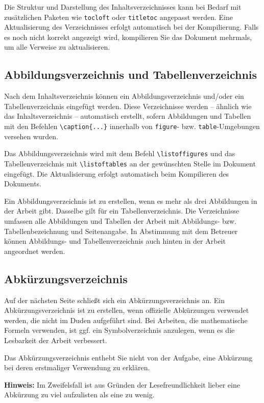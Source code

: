 Die Struktur und Darstellung des Inhaltsverzeichnisses kann bei Bedarf mit zusätzlichen Paketen wie \verb|tocloft| oder \verb|titletoc| angepasst werden. Eine Aktualisierung des Verzeichnisses erfolgt automatisch bei der Kompilierung. Falls es noch nicht korrekt angezeigt wird, kompilieren Sie das Dokument mehrmals, um alle Verweise zu aktualisieren.

\subsection{Abbildungsverzeichnis und Tabellenverzeichnis}

Nach dem Inhaltsverzeichnis können ein Abbildungsverzeichnis und/oder ein Tabellenverzeichnis eingefügt werden. Diese Verzeichnisse werden – ähnlich wie das Inhaltsverzeichnis – automatisch erstellt, sofern Abbildungen und Tabellen mit den Befehlen \verb|\caption{...}| innerhalb von \verb|figure|- bzw. \verb|table|-Umgebungen versehen wurden.

Das Abbildungsverzeichnis wird mit dem Befehl \verb|\listoffigures| und das Tabellenverzeichnis mit \verb|\listoftables| an der gewünschten Stelle im Dokument eingefügt. Die Aktualisierung erfolgt automatisch beim Kompilieren des Dokuments.


Ein Abbildungsverzeichnis ist zu erstellen, wenn es mehr als drei Abbildungen in der Arbeit gibt. Dasselbe gilt für ein Tabellenverzeichnis. Die Verzeichnisse umfassen alle Abbildungen und Tabellen der Arbeit mit Abbildungs- bzw. Tabellenbezeichnung und Seitenangabe. In Abstimmung mit dem Betreuer können Abbildungs- und Tabellenverzeichnis auch hinten in der Arbeit angeordnet werden.

\subsection{Abkürzungsverzeichnis}

Auf der nächsten Seite schließt sich ein Abkürzungsverzeichnis an. Ein Abkürzungsverzeichnis ist zu erstellen, wenn offizielle Abkürzungen verwendet werden, die nicht im Duden aufgeführt sind. Bei Arbeiten, die mathematische Formeln verwenden, ist ggf. ein Symbolverzeichnis anzulegen, wenn es die Lesbarkeit der Arbeit verbessert.

Das Abkürzungsverzeichnis enthebt Sie nicht von der Aufgabe, eine Abkürzung bei deren erstmaliger Verwendung zu erklären.

\textbf{Hinweis:} Im Zweifelsfall ist aus Gründen der Lesefreundlichkeit lieber eine Abkürzung zu viel aufzulisten als eine zu wenig.

